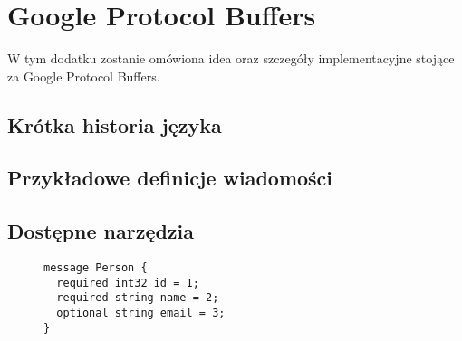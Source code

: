\chapter{Google Protocol Buffers}
\label{cha:appendixA}
W tym dodatku zostanie omówiona idea oraz szczegóły implementacyjne stojące za Google Protocol Buffers.

\section{Krótka historia języka}
\label{sec:protobuf_history}

\section{Przykładowe definicje wiadomości}
\label{sec:proto_file_examples}

\section{Dostępne narzędzia}
\label{sec:protobuf_available_tools}
\begin{figure}
\label{Najprostsza możliwa wiadomość ProtoBuf}
\begin{lstlisting}
message Person {
  required int32 id = 1;
  required string name = 2;
  optional string email = 3;
}
\end{lstlisting}
\end{figure}